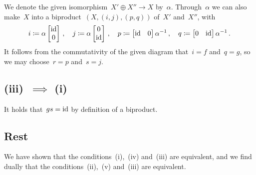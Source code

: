 We denote the given isomorphism~$X' \oplus X'' \to X$ by~$\alpha$.
Through~$\alpha$ we can also make~$X$ into a biproduct~$(X,(i,j),(p,q))$ of~$X'$ and~$X''$, with
\[
            i
  \coloneqq  \alpha
            \begin{bmatrix}
              \operatorname{id} \\
              0
            \end{bmatrix} \,,
  \quad
            j
  \coloneqq  \alpha
            \begin{bmatrix}
              0   \\
              \operatorname{id}
            \end{bmatrix} \,,
  \quad
            p
  \coloneqq  \begin{bmatrix}
              \operatorname{id} & 0
            \end{bmatrix}
            \alpha^{-1} \,,
  \quad
            q
  \coloneqq  \begin{bmatrix}
              0 & \operatorname{id}
            \end{bmatrix}
            \alpha^{-1} \,.
\]
It follows from the commutativity of the given diagram that~$i = f$ and~$q = g$, so we may choose~$r = p$ and~$s = j$.





\subsection*{(iii)~$\implies$ (i)}

It holds that~$gs = \operatorname{id}$ by definition of a biproduct.





\subsection*{Rest}

We have shown that the conditions~(i),~(iv) and~(iii) are equivalent, and we find dually that the conditions~(ii),~(v) and~(iii) are equivalent.


